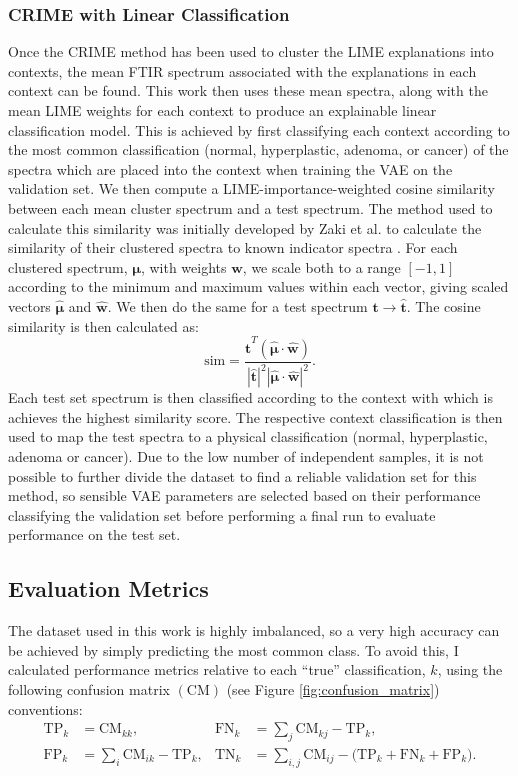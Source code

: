 \subsubsection{CRIME with Linear Classification}
\label{sec:crime_linear}
Once the CRIME method has been used to cluster the LIME explanations into contexts, the mean FTIR spectrum associated with the explanations in each context can be found. This work then uses these mean spectra, along with the mean LIME weights for each context to produce an explainable linear classification model. This is achieved by first classifying each context according to the most common classification (normal, hyperplastic, adenoma, or cancer) of the spectra which are placed into the context when training the VAE on the validation set. We then compute a LIME-importance-weighted cosine similarity between each mean cluster spectrum and a test spectrum. The method used to calculate this similarity was initially developed by Zaki et al. to calculate the similarity of their clustered spectra to known indicator spectra \cite{zaki_explainable_2024}. For each clustered spectrum, $\boldsymbol{\mu}$, with weights $\boldsymbol{w}$, we scale both to a range $[-1,1]$ according to the minimum and maximum values within each vector, giving scaled vectors $\hat{\boldsymbol{\mu}}$ and $\hat{\boldsymbol{w}}$. We then do the same for a test spectrum $\boldsymbol{t}\rightarrow \hat{\boldsymbol{t}}$. The cosine similarity is then calculated as:
\begin{equation}
    \text{sim}=\frac{\hat{\boldsymbol{t}}^T (\hat{\boldsymbol{\mu}} \cdot \hat{\boldsymbol{w}})}{|\hat{\boldsymbol{t}}|^2 |\hat{\boldsymbol{\mu}} \cdot \hat{\boldsymbol{w}}|^2}.
\end{equation}
Each test set spectrum is then classified according to the context with which is achieves the highest similarity score. The respective context classification is then used to map the test spectra to a physical classification (normal, hyperplastic, adenoma or cancer). Due to the low number of independent samples, it is not possible to further divide the dataset to find a reliable validation set for this method, so sensible VAE parameters are selected based on their performance classifying the validation set before performing a final run to evaluate performance on the test set.

\subsection{Evaluation Metrics}
The dataset used in this work is highly imbalanced, so a very high accuracy can be achieved by simply predicting the most common class. To avoid this, I calculated performance metrics relative to each ``true'' classification, $k$, using the following confusion matrix $(\mathrm{CM})$ (see Figure \ref{fig:confusion_matrix}) conventions:
\begin{align}
\text{TP}_k &= \mathrm{CM}_{kk}, &
\text{FN}_k &= \sum_j \mathrm{CM}_{kj} - \text{TP}_k, \\
\text{FP}_k &= \sum_i \mathrm{CM}_{ik} - \text{TP}_k, &
\text{TN}_k &= \sum_{i,j} \mathrm{CM}_{ij} - \bigl(\text{TP}_k+\text{FN}_k+\text{FP}_k\bigr).
\end{align}

